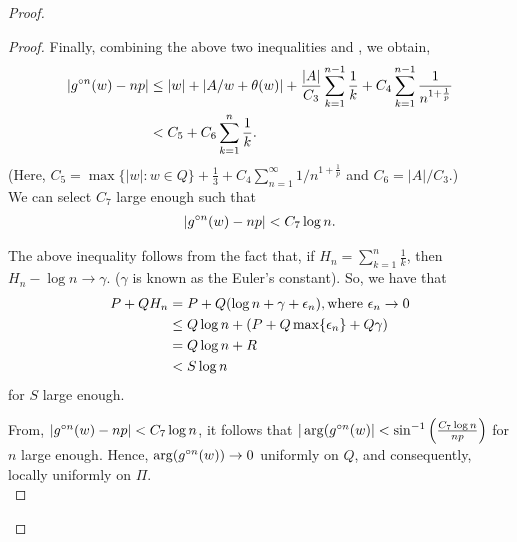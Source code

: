 \begin{proof}
\begin{proof}
Finally, combining the above two inequalities and , we obtain,
\begin{align*}
	|\gog[n](w)-np|&\le |w|+|A /w+\theta (w)|+\frac{|A|}{C_3}\sum_{k=1}^{n-1} \frac{1}{k}+C_4\sum_{k=1}^{n-1} \frac{1}{n^{1+\frac{1}{p}}}\\
				   &< C_5+C_6\sum_{k=1}^{n} \frac{1}{k}
.\end{align*}
(Here, \( C_5=\max\{|w|:w\in Q\}+\frac{1}{3}+C_4\sum_{n=1}^{\infty}  1 /n^{1+\frac{1}{p}} \) and \( C_6=|A| /C_3\).)\\
We can select \( C_7 \) large enough such that
\begin{align}
	|\gog[n](w)-np|<C_7 \log n \label{eqn3.7}
.\end{align}

\begin{remark}
	The above inequality follows from the fact that, if \( H_n=\sum_{k=1}^n \frac{1}{k} \), then \( H_n-\log n\to \gamma \).
	(\( \gamma \) is known as the Euler's constant).
	So, we have that
	\begin{align*}
		P+QH_n &=P+Q(\log n+\gamma +\epsilon_n), \text{where \( \epsilon_n\to 0 \)}\\
			   &\le Q\log n+(P+Q\max\{\epsilon_n\}+Q\gamma)\\
			   &=Q\log n+R\\
			   &<S \log n
	\end{align*} for \( S \) large enough.
\end{remark}
From, \( |\gog[n](w)-np|<C_7\log n \), it follows that \( |\arg(\gog[n](w)|<\sin ^{-1}\left(\frac{C_7\log n}{np}\right) \)
for \( n \) large enough. Hence, \( \arg(\gog[n](w))\to 0 \) uniformly on \( Q \), and consequently, locally uniformly on \( \Pi \).\\
\vspace{1pt}


\end{proof}
\end{proof}
